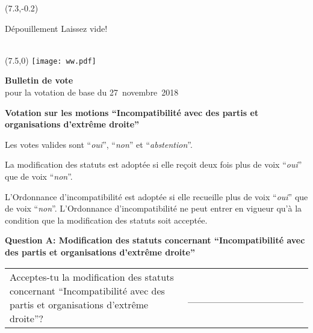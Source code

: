 \documentclass[11pt, a4paper]{scrartcl}
\newcommand{\votingdate}{27~novembre~2018}
\newcommand{\oui}{\enquote{\textit{oui}}}
\newcommand{\non}{\enquote{\textit{non}}}
\newcommand{\abstention}{\enquote{\textit{abstention}}}
\begin{document}
{\begin{minipage}[t][12.5cm][t]{\textwidth}
\begin{textblock}{6}(7.3,-0.2)
\begin{framed}
Dépouillement \hfill Laissez vide! \\
\vspace{1.5cm} ~ \\
\end{framed}
\end{textblock}


\end{minipage}

\newpage

\begin{minipage}[t][12.5cm][t]{17.7cm}

\begin{textblock}{6}(7.5,0)
\texttt{[image: ww.pdf]}
\end{textblock}

{\LARGE\textbf{Bulletin de vote}} \\
pour la votation de base du \votingdate{} \\

\vspace{2cm}

{\Large\textbf{Votation sur les motions \enquote{Incompatibilité avec des partis et organisations d'extrême droite}}}

\vspace{0.3cm}

Les votes valides sont \oui{}, \non{} et \abstention{}.

\vspace{0.15cm}

La modification des statuts est adoptée si elle reçoit deux fois plus de voix \oui{} que de voix \non{}.

\vspace{0.15cm}

L'Ordonnance d'incompatibilité est adoptée si elle recueille plus de voix \oui{} que de voix \non{}. L'Ordonnance d'incompatibilité ne peut entrer en vigueur qu'à la condition que la modification des statuts soit acceptée.

\vspace{1cm}

\textbf{Question A: Modification des statuts concernant \enquote{Incompatibilité avec des partis et organisations d'extrême droite}}

\vspace{0.5cm}

\begin{tabular}{ b{13.5cm} b{3cm} }
Acceptes-tu la modification des statuts concernant \enquote{Incompatibilité avec des partis et organisations d'extrême droite}?
& \_\_\_\_\_\_\_\_\_\_\_\_\_\_\_\_ \\
\end{tabular}


\end{minipage}}
\end{document}
